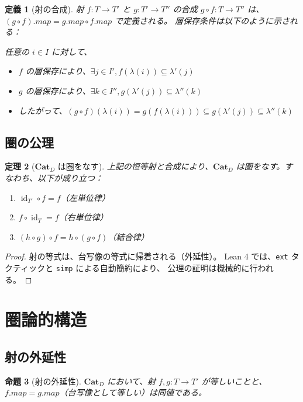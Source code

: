 \documentclass[a4paper,12pt]{ltjsarticle}
\newtheorem{theorem}{定理}[section]
\newtheorem{definition}[theorem]{定義}
\newtheorem{proposition}[theorem]{命題}
\DeclareMathOperator{\id}{id}
\begin{document}
\begin{definition}[射の合成]
射 $f: T \to T'$ と $g: T' \to T''$ の合成 $g \circ f: T \to T''$ は、
$(g \circ f).map = g.map \circ f.map$ で定義される。
層保存条件は以下のように示される：

任意の $i \in I$ に対して、
\begin{itemize}
  \item $f$ の層保存により、$\exists j \in I', f(\lambda(i)) \subseteq \lambda'(j)$
  \item $g$ の層保存により、$\exists k \in I'', g(\lambda'(j)) \subseteq \lambda''(k)$
  \item したがって、$(g \circ f)(\lambda(i)) = g(f(\lambda(i))) \subseteq g(\lambda'(j)) \subseteq \lambda''(k)$
\end{itemize}
\end{definition}

\subsection{圏の公理}

\begin{theorem}[$\mathbf{Cat}_D$ は圏をなす]
\label{thm:category}
上記の恒等射と合成により、$\mathbf{Cat}_D$ は圏をなす。すなわち、以下が成り立つ：
\begin{enumerate}
  \item $\id_{T'} \circ f = f$（左単位律）
  \item $f \circ \id_T = f$（右単位律）
  \item $(h \circ g) \circ f = h \circ (g \circ f)$（結合律）
\end{enumerate}
\end{theorem}

\begin{proof}
射の等式は、台写像の等式に帰着される（外延性）。
Lean 4 では、\texttt{ext} タクティックと \texttt{simp} による自動簡約により、
公理の証明は機械的に行われる。
\end{proof}

\section{圏論的構造}

\subsection{射の外延性}

\begin{proposition}[射の外延性]
\label{prop:ext}
$\mathbf{Cat}_D$ において、射 $f, g: T \to T'$ が等しいことと、
$f.map = g.map$（台写像として等しい）は同値である。
\end{proposition}
\end{document}
